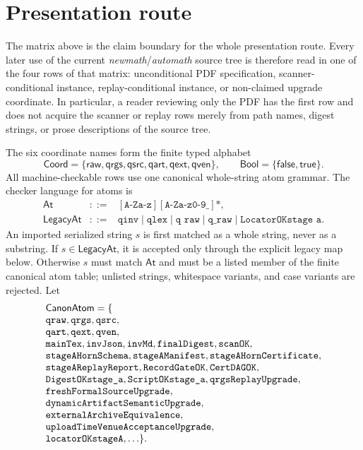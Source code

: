 \documentclass[runningheads]{llncs}
\DeclareRobustCommand{\auditcode}[1]{\mbox{\normalfont\ttfamily\detokenize{#1}}}
\DeclareRobustCommand{\auditatom}[1]{\auditcode{#1}}
\newcommand{\Coord}{\mathsf{Coord}}
\newcommand{\Bool}{\mathsf{Bool}}
\newcommand{\CanonAtom}{\mathsf{CanonAtom}}
\begin{document}
\section{Presentation route}
The matrix above is the claim boundary for the whole presentation route.  Every
later use of the current \emph{newmath}/\emph{automath} source tree is therefore
read in one of the four rows of that matrix: unconditional PDF specification,
scanner-conditional instance, replay-conditional instance, or non-claimed
upgrade coordinate.  In particular, a reader reviewing only the PDF has the
first row and does not acquire the scanner or replay rows merely from path names,
digest strings, or prose descriptions of the source tree.

The six coordinate names form the finite typed alphabet
\[
\Coord=\{\mathsf{raw},\mathsf{qrgs},\mathsf{qsrc},\mathsf{qart},
\mathsf{qext},\mathsf{qven}\},\qquad
\Bool=\{\mathsf{false},\mathsf{true}\}.
\]
All machine-checkable rows use one canonical whole-string atom grammar.  The
checker language for atoms is
\[
\begin{array}{rcl}
\mathsf{At} &::=& [\texttt{A-Za-z}][\texttt{A-Za-z0-9\_}]*,\\
\mathsf{LegacyAt} &::=& \texttt{qinv}\mid \texttt{qlex}\mid \texttt{q raw}\mid
\texttt{q\_raw}\mid \texttt{LocatorOKstage a}.
\end{array}
\]
An imported serialized string \(s\) is first matched as a whole string, never as
a substring.  If \(s\in\mathsf{LegacyAt}\), it is accepted only through the explicit
legacy map below.  Otherwise \(s\) must match \(\mathsf{At}\) and must be a listed member
of the finite canonical atom table; unlisted strings, whitespace variants, and
case variants are rejected.  Let
\[
\begin{array}{@{}l@{}}
\CanonAtom=\{\\
\auditatom{qraw},\auditatom{qrgs},\auditatom{qsrc},\\
\auditatom{qart},\auditatom{qext},\auditatom{qven},\\
\auditatom{mainTex},\auditatom{invJson},\auditatom{invMd},\auditatom{finalDigest},
\auditatom{scanOK},\\
\auditatom{stageAHornSchema},\auditatom{stageAManifest},
\auditatom{stageAHornCertificate},\\
\auditatom{stageAReplayReport},\auditatom{RecordGateOK},
\auditatom{CertDAGOK},\\
\auditatom{DigestOKstage_a},\auditatom{ScriptOKstage_a},
\auditatom{qrgsReplayUpgrade},\\
\auditatom{freshFormalSourceUpgrade},\\
\auditatom{dynamicArtifactSemanticUpgrade},\\
\auditatom{externalArchiveEquivalence},\\
\auditatom{uploadTimeVenueAcceptanceUpgrade},\\
\auditatom{locatorOKstageA},\ldots\}.
\end{array}
\]
\end{document}
